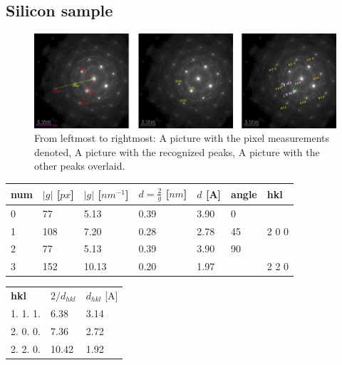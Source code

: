 \documentclass[a4paper]{scrartcl}
\begin{document}
\subsection*{Silicon sample}
\begin{figure}[H]
  \centering
  \includegraphics[width=1\linewidth, keepaspectratio]{SI-EDP-index.png}
  \caption{From leftmost to rightmost: A picture with the pixel measurements denoted, A picture with the recognized peaks, A picture with the other peaks overlaid.}
  \label{fig:si_sample}
\end{figure}

\begin{table}[H]
  \centering
  \begin{tabular}{lllllll}
    \textbf{num}           & $|g|$ [$px$] & $|g|$ [$nm^{-1}$] & $d=\frac{2}{g}$ [$nm$] & $d$ [A] & \textbf{angle}          & \textbf{hkl} \\ \hline
    \multicolumn{1}{l|}{0} & 77           & 5.13              & 0.39                   & 3.90    & \multicolumn{1}{l|}{0}  &              \\
    \multicolumn{1}{l|}{1} & 108          & 7.20              & 0.28                   & 2.78    & \multicolumn{1}{l|}{45} & 2 0 0        \\
    \multicolumn{1}{l|}{2} & 77           & 5.13              & 0.39                   & 3.90    & \multicolumn{1}{l|}{90} &              \\
    \multicolumn{1}{l|}{3} & 152          & 10.13             & 0.20                   & 1.97    & \multicolumn{1}{l|}{}   & 2 2 0
  \end{tabular}
  \label{tab:si}
\end{table}
\begin{table}[H]
  \centering
  \begin{tabular}{lll}
    \textbf{hkl} & $2/d_{hkl}$ & $d_{hkl}$  [A] \\
    1. 1. 1.     & 6.38        & 3.14           \\
    2. 0. 0.     & 7.36        & 2.72           \\
    2. 2. 0.     & 10.42       & 1.92
  \end{tabular}
  \label{tab:si_lit}
\end{table}\\
\end{document}
